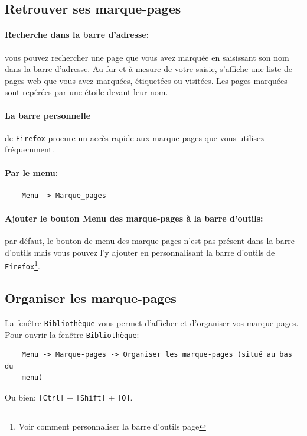 \documentclass[a4paper,11pt]{book}
\begin{document}
\subsection*{Retrouver ses marque-pages}
\paragraph*{Recherche dans la barre d’adresse:}vous pouvez rechercher une page que vous avez marquée en saisissant son nom dans la barre d’adresse. Au fur et à mesure de votre saisie, s’affiche une liste de pages web que vous avez marquées, étiquetées ou visitées. Les pages marquées sont repérées par une étoile devant leur nom. 
\medskip

\paragraph*{La barre personnelle}de \texttt{Firefox} procure un accès rapide aux marque-pages que vous utilisez fréquemment.
\medskip

\paragraph*{Par le menu:}
\begin{verbatim}
    Menu -> Marque_pages
\end{verbatim}
\medskip

\paragraph{Ajouter le bouton \og Menu des marque-pages\fg{} à la barre d’outils:}par défaut, le bouton de menu des marque-pages n’est pas présent dans la barre d’outils mais vous pouvez l’y ajouter en personnalisant la barre d’outils de \texttt{Firefox}\footnote{Voir comment personnaliser la barre d'outils page \pageref{barre_outils}}.
\medskip

\subsection*{Organiser les marque-pages}
La fenêtre \texttt{Bibliothèque} vous permet d’afficher et d’organiser vos marque-pages. Pour ouvrir la fenêtre \texttt{Bibliothèque}:
\begin{verbatim}
    Menu -> Marque-pages -> Organiser les marque-pages (situé au bas du 
    menu)
\end{verbatim} 
\medskip

Ou bien: \texttt{[Ctrl]} + \texttt{[Shift]} + \texttt{[O]}.
\medskip
\end{document}
